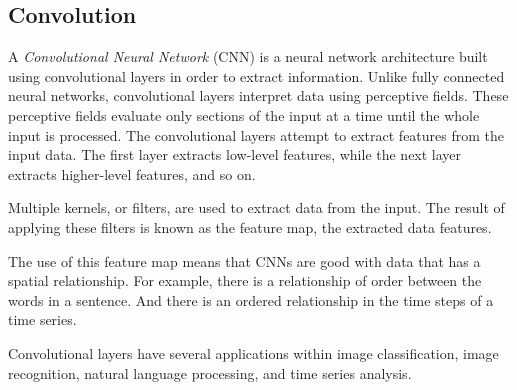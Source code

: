 \subsection{Convolution}
A \textit{Convolutional Neural Network} (CNN) is a neural network architecture built using convolutional layers in order to extract information.
Unlike fully connected neural networks, convolutional layers interpret data using perceptive fields.
These perceptive fields evaluate only sections of the input at a time until the whole input is processed.
The convolutional layers attempt to extract features from the input data.
The first layer extracts low-level features, while the next layer extracts higher-level features, and so on.

\cite[p.~443-446]{Geron2017}


Multiple kernels, or filters, are used to extract data from the input.
The result of applying these filters is known as the feature map, the extracted data features.

The use of this feature map means that CNNs are good with data that has a spatial
relationship. For example, there is a relationship of order between the words in a sentence.
And there is an ordered relationship in the time steps of a time series.

Convolutional layers have several applications within image classification,
image recognition, natural language processing, and time series analysis.


